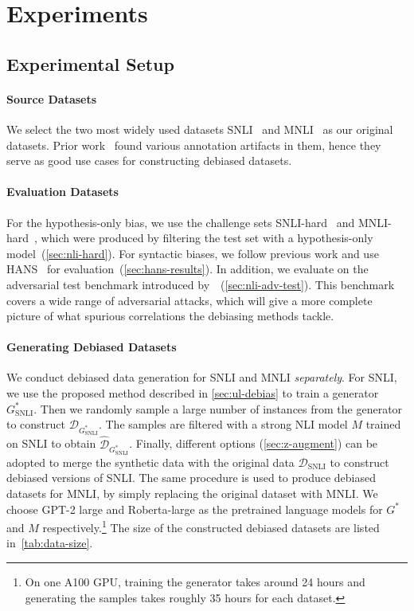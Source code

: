 \section{Experiments} \label{sec:exp}
\subsection{Experimental Setup}


\paragraph{Source Datasets}

We select the two most widely used \ourtask{} datasets SNLI~\citep{snli} and MNLI~\citep{mnli} as our original datasets.
Prior work~\citep{GururanganSLSBS18,PoliakNHRD18,hans} found various annotation artifacts in them, hence they serve as good use cases for constructing debiased datasets.

\paragraph{Evaluation Datasets}
For the hypothesis-only bias, we use the challenge sets SNLI-hard~\citep{GururanganSLSBS18} and MNLI-hard~\citep{mnli}, which were produced by filtering the test set with a hypothesis-only model~(\cref{sec:nli-hard}).
For syntactic biases, we follow previous work and use HANS~\citep{hans} for evaluation~(\cref{sec:hans-results}).
In addition, we evaluate on the adversarial test benchmark introduced by~\citet{model-agnostic-debias}~(\cref{sec:nli-adv-test}).
This benchmark covers a wide range of adversarial attacks, which will give a more complete picture of what spurious correlations the debiasing methods tackle. 



\paragraph{Generating Debiased Datasets}
We conduct debiased data generation for SNLI and MNLI \emph{separately}.
For SNLI, we use the proposed method described in \cref{sec:ul-debias} to train a generator $G^*_{\text{SNLI}}$.
Then we randomly sample a large number of instances from the generator to construct $\mathcal{D}_{G^*_{\text{SNLI}}}$.
The samples are filtered with a strong NLI model $M$ trained on SNLI to obtain  $\hat{\mathcal{D}}_{G^*_{\text{SNLI}}}$.
Finally, different options (\cref{sec:z-augment}) can be adopted to merge the synthetic data with the original data $\mathcal{D}_{\text{SNLI}}$  to construct debiased versions of SNLI.
The same procedure is used to produce debiased datasets for MNLI, by simply replacing the original dataset with MNLI.
We choose GPT-2 large and Roberta-large as the pretrained language models for $G^*$ and $M$ respectively.\footnote{On one A100 GPU, training the generator takes around 24 hours and generating the samples takes roughly 35 hours for each dataset.}
The size of the constructed debiased datasets are listed in~\cref{tab:data-size}.


